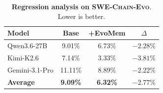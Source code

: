 \documentclass{article}
\begin{document}
\begin{table}[h]
\centering
\small
\setlength{\tabcolsep}{8pt}
\renewcommand{\arraystretch}{1.18}
\caption{\small \textbf{Regression analysis on \textsc{SWE-Chain-Evo}}. Lower is better.}
\label{tab:swe_chain_regression}
\begin{tabular*}{0.78\linewidth}{@{\extracolsep{\fill}}lccc}
\toprule
\textbf{Model} & \textbf{Base} & \textbf{+EvoMem} & \textbf{$\Delta$} \\
\midrule
Qwen3.6-27B & 9.01\% & 6.73\% & \textcolor{green!50!black}{$-2.28\%$} \\
Kimi-K2.6 & 7.14\% & 3.33\% & \textcolor{green!50!black}{$-3.81\%$} \\
Gemini-3.1-Pro & 11.11\% & 8.89\% & \textcolor{green!50!black}{$-2.22\%$} \\
\midrule
\textbf{Average} & \textbf{9.09\%} & \textbf{6.32\%} & \textcolor{green!50!black}{\textbf{$-2.77\%$}} \\
\bottomrule
\end{tabular*}
\vspace{-1mm}
\end{table}
\end{document}
